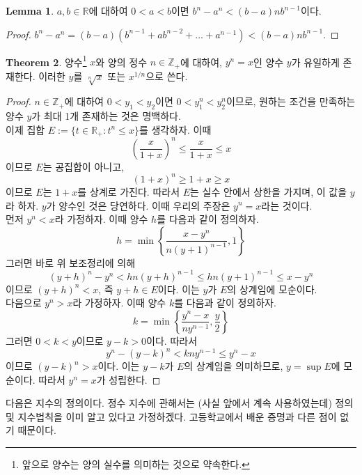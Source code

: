 \documentclass[11pt]{book}
\numberwithin{equation}{chapter}
\def\ZZ{\mathbb{Z}}
\def\RR{\mathbb{R}}
\newcommand{\paren}[1]{\left(#1\right)}
\theoremstyle{definition}
\newtheorem{thm}{Theorem}[section]
\newtheorem{lem}[thm]{Lemma}
\begin{document}
    \begin{lem}
        \(a, b \in \RR\)에 대하여 \(0 < a < b\)이면 \(b^n - a^n < (b - a)nb^{n-1}\)이다.
    \end{lem}
    \begin{proof}
        \(b^n - a^n = (b - a)(b^{n-1} + ab^{n-2} + \ldots + a^{n-1}) < (b-a)nb^{n-1}\).
    \end{proof}

    \begin{thm}
        양수\footnote{앞으로 양수는 양의 실수를 의미하는 것으로 약속한다.} \(x\)와 양의 정수 \(n \in \ZZ_+\)에 대하여, \(y^n = x\)인 양수 \(y\)가 유일하게 존재한다. 이러한 \(y\)를 \(\sqrt[n]{x}\) 또는 \(x^{1/n}\)으로 쓴다.
    \end{thm}
    \begin{proof}
        \(n \in \ZZ_+\)에 대하여 \(0 < y_1 < y_2\)이면 \(0 < y_1^n < y_2^n\)이므로, 원하는 조건을 만족하는 양수 \(y\)가 최대 1개 존재하는 것은 명백하다.\\
        이제 집합 \(E := \{t \in \RR_+: t^n \le x\} \)를 생각하자. 이때
        \[
        \paren{\frac{x}{1+x} }^n \le \frac{x}{1+x} \le x
        \]
        이므로 \(E\)는 공집합이 아니고,
        \[
        (1+x)^n \ge 1+x \ge x
        \]
        이므로 \(E\)는 \(1+x\)를 상계로 가진다. 따라서 \(E\)는 실수 안에서 상한을 가지며, 이 값을 \(y\)라 하자. \(y\)가 양수인 것은 당연하다. 이때 우리의 주장은 \(y^n = x\)라는 것이다.\\
        먼저 \(y^n < x\)라 가정하자. 이때 양수 \(h\)를 다음과 같이 정의하자.
        \[
            h = \min\left\{\frac{x - y^n}{n(y+1)^{n-1}}, 1\right\}
        \]
        그러면 바로 위 보조정리에 의해
        \[
        (y+h)^n - y^n < hn(y+h)^{n-1} \le hn(y+1)^{n-1} \le x - y^n
        \]
        이므로 \((y+h)^n < x\), 즉 \(y + h \in E\)이다. 이는 \(y\)가 \(E\)의 상계임에 모순이다.\\
        다음으로 \(y^n > x\)라 가정하자. 이때 양수 \(k\)를 다음과 같이 정의하자.
        \[
        k = \min\left\{\frac{y^n - x}{ny^{n-1}}, \frac{y}{2}\right\} 
        \]
        그러면 \(0 < k < y\)이므로 \(y - k > 0\)이다. 따라서
        \[
        y^n - (y - k)^n < kny^{n-1} \le y^n - x    
        \]
        이므로 \((y - k)^n > x\)이다. 이는 \(y - k\)가 \(E\)의 상계임을 의미하므로, \(y = \sup E\)에 모순이다. 따라서 \(y^n = x\)가 성립한다.
    \end{proof}

다음은 지수의 정의이다. 정수 지수에 관해서는 (사실 앞에서 계속 사용하였는데) 정의 및 지수법칙을 이미 알고 있다고 가정하겠다. 고등학교에서 배운 증명과 다른 점이 없기 때문이다. 
\end{document}
